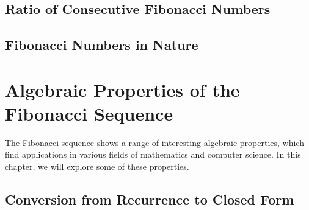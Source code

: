 \documentclass[openany]{book}
\begin{document}
\section{Ratio of Consecutive Fibonacci Numbers}
\section{Fibonacci Numbers in Nature}

\chapter{Algebraic Properties of the Fibonacci Sequence}
The Fibonacci sequence shows a range of interesting algebraic properties, which find applications in various fields of mathematics and computer science. In this chapter, we will explore some of these properties.
\section{Conversion from Recurrence to Closed Form}
\end{document}
